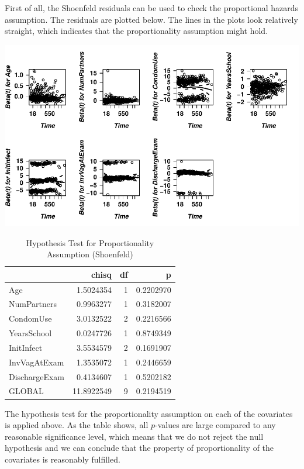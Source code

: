 \documentclass[
]{article}
\begin{document}
First of all, the Shoenfeld residuals can be used to check the proportional hazards assumption. The residuals are plotted below. The lines in the plots look relatively straight, which indicates that the proportionality assumption might hold.

\includegraphics{practical_files/figure-latex/unnamed-chunk-5-1.pdf}

\begin{table}

\caption{\label{tab:unnamed-chunk-6}Hypothesis Test for Proportionality Assumption (Shoenfeld)}
\centering
\begin{tabular}[t]{l|r|r|r}
\hline
  & chisq & df & p\\
\hline
Age & 1.5024354 & 1 & 0.2202970\\
\hline
NumPartners & 0.9963277 & 1 & 0.3182007\\
\hline
CondomUse & 3.0132522 & 2 & 0.2216566\\
\hline
YearsSchool & 0.0247726 & 1 & 0.8749349\\
\hline
InitInfect & 3.5534579 & 2 & 0.1691907\\
\hline
InvVagAtExam & 1.3535072 & 1 & 0.2446659\\
\hline
DischargeExam & 0.4134607 & 1 & 0.5202182\\
\hline
GLOBAL & 11.8922549 & 9 & 0.2194519\\
\hline
\end{tabular}
\end{table}

The hypothesis test for the proportionality assumption on each of the covariates is applied above. As the table shows, all \(p\)-values are large compared to any reasonable significance level, which means that we do not reject the null hypothesis and we can conclude that the property of proportionality of the covariates is reasonably fulfilled.
\end{document}
